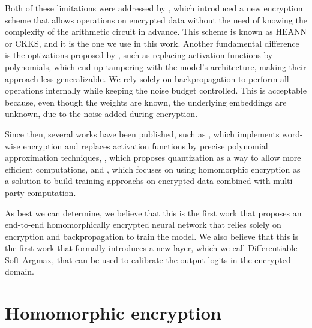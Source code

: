 \documentclass{article}
\begin{document}
Both of these limitations were addressed by \cite{cheon2017homomorphic}, which introduced a new encryption scheme that allows operations on encrypted data without the need of knowing the complexity of the arithmetic circuit in advance. This scheme is known as HEANN or CKKS, and it is the one we use in this work. Another fundamental difference is the optizations proposed by \cite{gilad2016cryptonets}, such as replacing activation functions by polynomials, which end up tampering with the model's architecture, making their approach less generalizable. We rely solely on backpropagation to perform all operations internally while keeping the noise budget controlled. This is acceptable because, even though the weights are known, the underlying embeddings are unknown, due to the noise added during encryption.

Since then, several works have been published, such as \cite{lee2023precise}, which implements word-wise encryption and replaces activation functions by precise polynomial approximation techniques, \cite{legiest2023neural}, which proposes quantization as a way to allow more efficient computations, and \cite{montero2024neural}, which focuses on using homomorphic encryption as a solution to build training approachs on encrypted data combined with multi-party computation. 

As best we can determine, we believe that this is the first work that proposes an end-to-end homomorphically encrypted neural network that relies solely on encryption and backpropagation to train the model. We also believe that this is the first work that formally introduces a new layer, which we call Differentiable Soft-Argmax, that can be used to calibrate the output logits in the encrypted domain.


\vspace{10mm}

\section{Homomorphic encryption}
\end{document}
